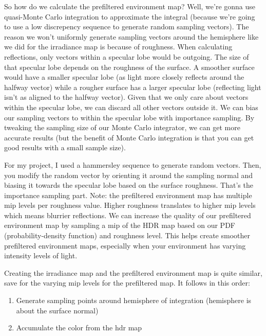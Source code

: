 \documentclass{article}
\begin{document}
So how do we calculate the prefiltered environment map? Well, we're gonna use quasi-Monte Carlo integration to approximate the integral (because
we're going to use a low discrepency sequence to generate random sampling vectors). The reason we won't uniformly generate sampling vectors around the hemisphere
like we did for the irradiance map is because of roughness. When calculating reflections, only vectors within a specular lobe would be outgoing. The size of that
specular lobe depends on the roughness of the surface. A smoother surface would have a smaller specular lobe (as light more closely reflects around the halfway vector)
while a rougher surface has a larger specular lobe (reflecting light isn't as aligned to the halfway vector). Given that we only care about vectors within
the specular lobe, we can discard all other vectors outside it. We can bias our sampling vectors to within the specular lobe with importance sampling. By tweaking
the sampling size of our Monte Carlo integrator, we can get more accurate results (but the benefit of Monte Carlo integration is that you can get good results with a 
small sample size).

For my project, I used a hammersley sequence to generate random vectors. Then, you modify the random vector by orienting it around the sampling normal
and biasing it towards the specular lobe based on the surface roughness. That's the importance sampling part. Note: the prefiltered environment map has multiple mip levels
per roughness value. Higher roughness translates to higher mip levels which means blurrier reflections. We can increase the quality of our prefiltered environment map
by sampling a mip of the HDR map based on our PDF (probability-density function) and roughness level. This helps create smoother prefiltered environment maps, especially when your
environment has varying intensity levels of light.

Creating the irradiance map and the prefiltered environment map is quite similar, save for the varying mip levels for the prefiltered map. It follows
in this order:
\begin{enumerate}
  \item Generate sampling points around hemisphere of integration (hemisphere is about the surface normal)
  \item Accumulate the color from the hdr map
\end{enumerate}
\end{document}
